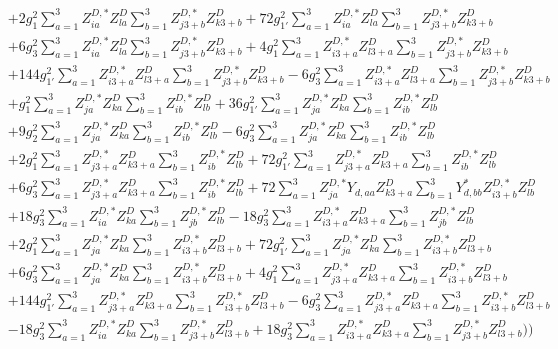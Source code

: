 \begin{align}
 &+2 g_{1}^{2} \sum_{a=1}^{3}Z^{D,*}_{i a} Z_{{l a}}^{D}  \sum_{b=1}^{3}Z^{D,*}_{j 3 + b} Z_{{k 3 + b}}^{D}  +72 g_{1'}^{2} \sum_{a=1}^{3}Z^{D,*}_{i a} Z_{{l a}}^{D}  \sum_{b=1}^{3}Z^{D,*}_{j 3 + b} Z_{{k 3 + b}}^{D}  \nonumber \\ 
 &+6 g_{3}^{2} \sum_{a=1}^{3}Z^{D,*}_{i a} Z_{{l a}}^{D}  \sum_{b=1}^{3}Z^{D,*}_{j 3 + b} Z_{{k 3 + b}}^{D}  +4 g_{1}^{2} \sum_{a=1}^{3}Z^{D,*}_{i 3 + a} Z_{{l 3 + a}}^{D}  \sum_{b=1}^{3}Z^{D,*}_{j 3 + b} Z_{{k 3 + b}}^{D}  \nonumber \\ 
 &+144 g_{1'}^{2} \sum_{a=1}^{3}Z^{D,*}_{i 3 + a} Z_{{l 3 + a}}^{D}  \sum_{b=1}^{3}Z^{D,*}_{j 3 + b} Z_{{k 3 + b}}^{D}  -6 g_{3}^{2} \sum_{a=1}^{3}Z^{D,*}_{i 3 + a} Z_{{l 3 + a}}^{D}  \sum_{b=1}^{3}Z^{D,*}_{j 3 + b} Z_{{k 3 + b}}^{D}  \nonumber \\ 
 &+g_{1}^{2} \sum_{a=1}^{3}Z^{D,*}_{j a} Z_{{k a}}^{D}  \sum_{b=1}^{3}Z^{D,*}_{i b} Z_{{l b}}^{D}  +36 g_{1'}^{2} \sum_{a=1}^{3}Z^{D,*}_{j a} Z_{{k a}}^{D}  \sum_{b=1}^{3}Z^{D,*}_{i b} Z_{{l b}}^{D}  \nonumber \\ 
 &+9 g_{2}^{2} \sum_{a=1}^{3}Z^{D,*}_{j a} Z_{{k a}}^{D}  \sum_{b=1}^{3}Z^{D,*}_{i b} Z_{{l b}}^{D}  -6 g_{3}^{2} \sum_{a=1}^{3}Z^{D,*}_{j a} Z_{{k a}}^{D}  \sum_{b=1}^{3}Z^{D,*}_{i b} Z_{{l b}}^{D}  \nonumber \\ 
 &+2 g_{1}^{2} \sum_{a=1}^{3}Z^{D,*}_{j 3 + a} Z_{{k 3 + a}}^{D}  \sum_{b=1}^{3}Z^{D,*}_{i b} Z_{{l b}}^{D}  +72 g_{1'}^{2} \sum_{a=1}^{3}Z^{D,*}_{j 3 + a} Z_{{k 3 + a}}^{D}  \sum_{b=1}^{3}Z^{D,*}_{i b} Z_{{l b}}^{D}  \nonumber \\ 
 &+6 g_{3}^{2} \sum_{a=1}^{3}Z^{D,*}_{j 3 + a} Z_{{k 3 + a}}^{D}  \sum_{b=1}^{3}Z^{D,*}_{i b} Z_{{l b}}^{D}  +72 \sum_{a=1}^{3}Z^{D,*}_{j a} Y_{d,{a a}} Z_{{k 3 + a}}^{D}  \sum_{b=1}^{3}Y^*_{d,{b b}} Z^{D,*}_{i 3 + b} Z_{{l b}}^{D}  \nonumber \\ 
 &+18 g_{3}^{2} \sum_{a=1}^{3}Z^{D,*}_{i a} Z_{{k a}}^{D}  \sum_{b=1}^{3}Z^{D,*}_{j b} Z_{{l b}}^{D}  -18 g_{3}^{2} \sum_{a=1}^{3}Z^{D,*}_{i 3 + a} Z_{{k 3 + a}}^{D}  \sum_{b=1}^{3}Z^{D,*}_{j b} Z_{{l b}}^{D}  \nonumber \\ 
 &+2 g_{1}^{2} \sum_{a=1}^{3}Z^{D,*}_{j a} Z_{{k a}}^{D}  \sum_{b=1}^{3}Z^{D,*}_{i 3 + b} Z_{{l 3 + b}}^{D}  +72 g_{1'}^{2} \sum_{a=1}^{3}Z^{D,*}_{j a} Z_{{k a}}^{D}  \sum_{b=1}^{3}Z^{D,*}_{i 3 + b} Z_{{l 3 + b}}^{D}  \nonumber \\ 
 &+6 g_{3}^{2} \sum_{a=1}^{3}Z^{D,*}_{j a} Z_{{k a}}^{D}  \sum_{b=1}^{3}Z^{D,*}_{i 3 + b} Z_{{l 3 + b}}^{D}  +4 g_{1}^{2} \sum_{a=1}^{3}Z^{D,*}_{j 3 + a} Z_{{k 3 + a}}^{D}  \sum_{b=1}^{3}Z^{D,*}_{i 3 + b} Z_{{l 3 + b}}^{D}  \nonumber \\ 
 &+144 g_{1'}^{2} \sum_{a=1}^{3}Z^{D,*}_{j 3 + a} Z_{{k 3 + a}}^{D}  \sum_{b=1}^{3}Z^{D,*}_{i 3 + b} Z_{{l 3 + b}}^{D}  -6 g_{3}^{2} \sum_{a=1}^{3}Z^{D,*}_{j 3 + a} Z_{{k 3 + a}}^{D}  \sum_{b=1}^{3}Z^{D,*}_{i 3 + b} Z_{{l 3 + b}}^{D}  \nonumber \\ 
 &-18 g_{3}^{2} \sum_{a=1}^{3}Z^{D,*}_{i a} Z_{{k a}}^{D}  \sum_{b=1}^{3}Z^{D,*}_{j 3 + b} Z_{{l 3 + b}}^{D}  +18 g_{3}^{2} \sum_{a=1}^{3}Z^{D,*}_{i 3 + a} Z_{{k 3 + a}}^{D}  \sum_{b=1}^{3}Z^{D,*}_{j 3 + b} Z_{{l 3 + b}}^{D}  \Big)\Big)\end{align} 

